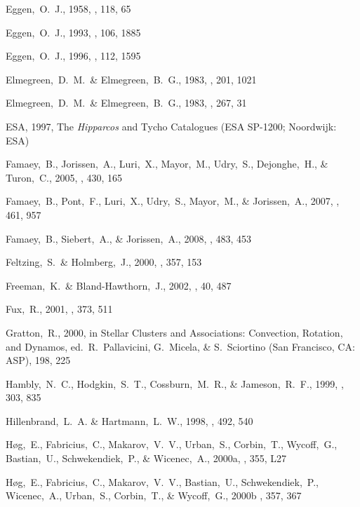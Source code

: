 \begin{thebibliography}{99}
  Eggen,~O.~J., 1958,
  \mnras, 118, 65

  Eggen,~O.~J., 1993,
  \aj, 106, 1885

  Eggen,~O.~J., 1996,
  \aj, 112, 1595

  Elmegreen,~D.~M.~\& Elmegreen,~B.~G., 1983,
  \mnras, 201, 1021

  Elmegreen,~D.~M.~\& Elmegreen,~B.~G., 1983,
  \apj, 267, 31

{ESA}, 1997, {The \emph{Hipparcos} and Tycho Catalogues} (ESA SP-1200; Noordwijk: ESA)

  Famaey,~B., Jorissen,~A., Luri,~X., Mayor,~M., Udry,~S., Dejonghe,~H., \& Turon,~C., 2005, 
  \aap, 430, 165

  Famaey,~B., Pont,~F., Luri,~X., Udry,~S., Mayor,~M., \& Jorissen,~A., 2007,
  \aap, 461, 957

  Famaey,~B., Siebert,~A., \& Jorissen,~A., 2008,
  \aap, 483, 453

  Feltzing,~S.~\& Holmberg,~J., 2000,
  \aap, 357, 153

  Freeman,~K.~\& Bland-Hawthorn,~J., 2002,
  \araa, 40, 487

  Fux,~R., 2001,
  \aap, 373, 511

  Gratton,~R., 2000,
  in Stellar Clusters and Associations: Convection, Rotation, and Dynamos,
  ed.~R.~Pallavicini, G.~Micela, \& S.~Sciortino (San Francisco, CA: ASP),
  198, 225

  Hambly,~N.~C., Hodgkin,~S.~T., Cossburn,~M.~R., \& Jameson,~R.~F., 1999,
  \mnras, 303, 835

  Hillenbrand,~L.~A. \& Hartmann,~L.~W., 1998,
  \apj, 492, 540

  H{\o}g,~E., Fabricius,~C., Makarov,~V.~V., Urban,~S., Corbin,~T., Wycoff,~G., Bastian,~U., Schwekendiek,~P., \& Wicenec,~A., 2000a,
  \aap, 355, L27

  H{\o}g,~E., Fabricius,~C., Makarov,~V.~V., Bastian,~U., Schwekendiek,~P., Wicenec,~A., Urban,~S., Corbin,~T., \& Wycoff,~G., 2000b
    \aap, 357, 367


\end{thebibliography}
